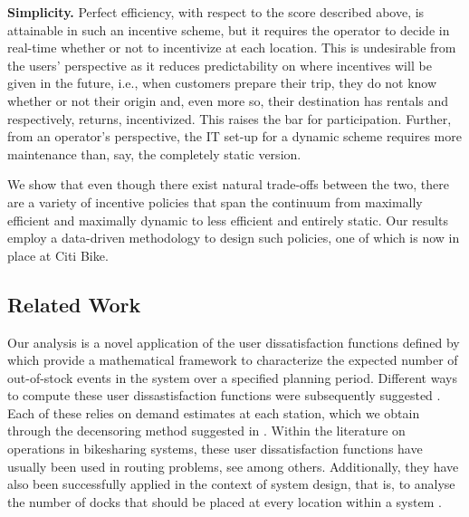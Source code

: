 \noindent \textbf{Simplicity. } Perfect efficiency, with respect to the score described above, is attainable in such an incentive scheme, but it requires the operator to decide in real-time whether or not to incentivize at each location. This is undesirable from the users' perspective as it reduces predictability on where incentives will be given in the future, i.e., when customers prepare their trip, they do not know whether or not their origin and, even more so, their destination has rentals and respectively, returns, incentivized. This raises the bar for participation. Further, from an operator's perspective, the IT set-up for a dynamic scheme requires more maintenance than, say, the completely static version. %

We show that even though there exist natural trade-offs between the two, there are a variety of incentive policies that span the continuum from maximally efficient and maximally dynamic to less efficient and entirely static. Our results employ a data-driven methodology to design such policies, one of which is now in place at Citi Bike.


\subsection{Related Work}\label{sec:rel_work}

Our analysis is a novel application of the user dissatisfaction functions defined by \cite{raviv2013optimal} which provide a mathematical framework to characterize the expected number of out-of-stock events in the system over a specified planning period. Different ways to compute these user dissastisfaction functions were subsequently suggested \cite{schuijbroek2013inventory,henomashm16,parikh2014estimation}. Each of these relies on demand estimates at each station, which we obtain through the decensoring method suggested in \cite{o2015data}. Within the literature on operations in bikesharing systems, these user dissatisfaction functions have usually been used in routing problems, see \cite{raviv2013static,forma20153,ho2014solving,szeto2016chemical,Freund2016Rebalancing} among others. Additionally, they have also been successfully applied in the context of system design, that is, to analyse the number of docks that should be placed at every location within a system \cite{henomashm16, frehenshm17}.

